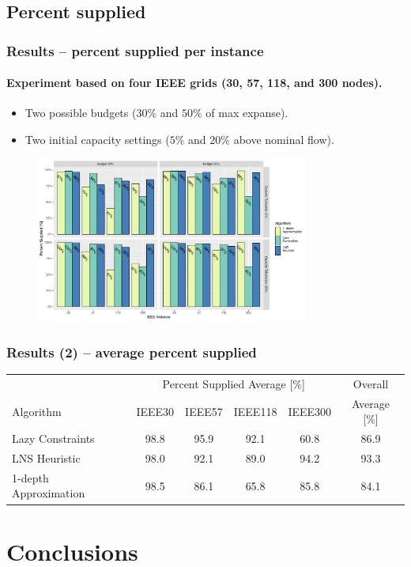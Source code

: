 \documentclass{beamer}
\begin{document}
\subsection{Percent supplied}
\begin{frame}
\frametitle{Results -- percent supplied per instance}
\framesubtitle{Experiment based on four IEEE grids (30, 57, 118, and 300 nodes).}
\tiny
\begin{itemize}
	\item Two possible budgets ($30\%$ and $50\%$ of max expanse).
	\item Two initial capacity settings ($5\%$ and $20\%$ above nominal flow).
\end{itemize}
\begin{figure}
\centering
\includegraphics[width=0.8\textwidth]{Aux_files/12hour_instance_results.pdf}
\end{figure}
\end{frame}
\begin{frame}
\frametitle{Results (2) -- average percent supplied}
\begin{table}%
\center
\scriptsize
\begin{tabular}{lccccc}
 & \multicolumn{4}{c}{Percent Supplied Average [\%]} & Overall\\
Algorithm & IEEE30 & IEEE57 & IEEE118 & IEEE300 & Average [\%]\\ \toprule
Lazy Constraints & 98.8 & 95.9 & 92.1 & 60.8 & 86.9\\ \midrule
LNS Heuristic & 98.0 & 92.1 & 89.0 & 94.2 & 93.3\\ \midrule
1-depth Approximation & 98.5 & 86.1 & 65.8 & 85.8 & 84.1 \\ \bottomrule
\end{tabular}
\end{table}
\end{frame}


\section{Conclusions}
\end{document}
